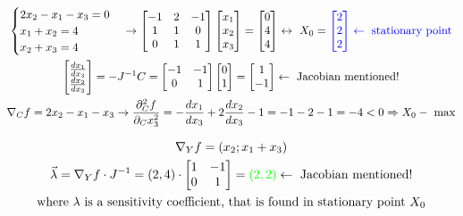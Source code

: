 \documentclass{article}
\begin{document}
\begin{fleqn}[1\parindent]
\begin{gather*}
    \begin{cases}
      2x_2-x_1-x_3=0 \\ 
      x_1+x_2=4 \\ 
      x_2+x_3=4
    \end{cases}
    \rightarrow 
    \begin{bmatrix}
      -1 & 2 &-1 \\ 
      1 & 1 & 0 \\ 
      0 & 1 & 1
    \end{bmatrix}
    \begin{bmatrix}
      x_1 \\ x_2 \\ x_3
    \end{bmatrix}
    = \begin{bmatrix}
      0 \\ 4 \\ 4
    \end{bmatrix}\leftrightarrow \
    X_0 = \color{blue}\begin{bmatrix}2\\2\\2\end{bmatrix} \leftarrow \text{ stationary point} \\ 
    \begin{bmatrix}
      \frac{dx_1}{dx_3}\\
      \frac{dx_2}{dx_3}
    \end{bmatrix} = -J^{-1}C = \begin{bmatrix}
      -1 & -1 \\ 
      0 & 1
    \end{bmatrix}
    \begin{bmatrix}
      0 \\ 1
    \end{bmatrix}
    = 
    \begin{bmatrix}
      1 \\ - 1
    \end{bmatrix} \leftarrow \text{ Jacobian mentioned!} \\ 
    \nabla_C f = 2x_2-x_1-x_3 \rightarrow
    \frac{\partial^2_C f}{\partial_C x^2_3} = -\frac{dx_1}{dx_3}+2\frac{dx_2}{dx_3}-1 =
    -1-2-1 = -4 < 0 \Rightarrow X_0 - \text{ max}
  \end{gather*}
\end{fleqn}

\addtolength{\jot}{2pt}
\begin{fleqn}
  \begin{gather*}
    \nabla_Yf = (x_2;x_1+x_3) \\ 
    \vec\lambda = \nabla_Yf \cdot J^{-1} = (2,4) \cdot \begin{bmatrix}
      1 & -1 \\ 
      0 & 1
    \end{bmatrix} = \color{green}(2,2)\color{black} \leftarrow \text{ Jacobian mentioned!} \\
    \text{where }\lambda \text{ is a sensitivity coefficient, that is found in stationary point } X_0 
  \end{gather*}
\end{fleqn}
\end{document}
